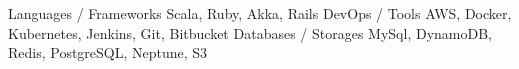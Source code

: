 \begin{cvhonors}
  \cvhonor
    {Languages / Frameworks}
    {Scala, Ruby, Akka, Rails}
    {}
    {}
  \cvhonor
    {DevOps / Tools}
    {AWS, Docker, Kubernetes, Jenkins, Git, Bitbucket}
    {}
    {}
  \cvhonor
    {Databases / Storages}
    {MySql, DynamoDB, Redis, PostgreSQL, Neptune, S3}
    {}
    {}
\end{cvhonors}
